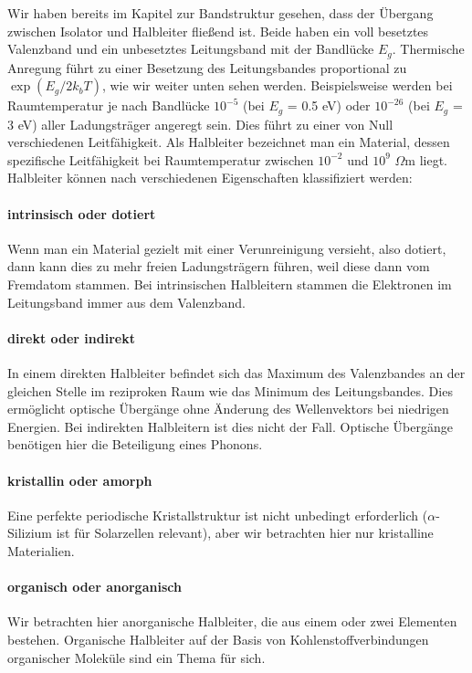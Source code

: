 Wir haben bereits im Kapitel zur Bandstruktur gesehen, dass der Übergang zwischen Isolator und Halbleiter fließend ist. Beide haben ein voll besetztes Valenzband und ein unbesetztes Leitungsband mit der Bandlücke $E_g$. Thermische Anregung führt zu einer Besetzung des Leitungsbandes proportional zu $\exp(E_g / 2 k_b T)$, wie wir weiter unten sehen werden. Beispielsweise werden bei Raumtemperatur je nach Bandlücke $10^{-5}$ (bei $E_g$ = 0.5 eV) oder $10^{-26}$ (bei $E_g$ = 3 eV) aller Ladungsträger angeregt sein. Dies führt zu einer von Null verschiedenen Leitfähigkeit. Als Halbleiter bezeichnet man ein Material, dessen spezifische Leitfähigkeit bei Raumtemperatur zwischen $10^{-2}$ und $10^9$ $\Omega$m liegt. Halbleiter können  nach verschiedenen Eigenschaften klassifiziert werden:


\paragraph*{intrinsisch oder dotiert} Wenn man ein Material gezielt mit einer Verunreinigung versieht, also dotiert, dann kann dies zu mehr freien Ladungsträgern führen, weil diese dann vom Fremdatom stammen. Bei intrinsischen Halbleitern stammen die Elektronen im Leitungsband immer aus dem Valenzband.

\paragraph*{direkt oder indirekt} In einem direkten Halbleiter befindet sich das Maximum des Valenzbandes an der gleichen Stelle im reziproken Raum wie das Minimum des Leitungsbandes. Dies ermöglicht optische  Übergänge ohne Änderung des Wellenvektors bei niedrigen Energien. Bei indirekten Halbleitern ist dies nicht der Fall. Optische Übergänge benötigen hier die Beteiligung eines Phonons.

\paragraph*{kristallin oder amorph} Eine perfekte periodische Kristallstruktur ist nicht unbedingt erforderlich ($\alpha$-Silizium ist für Solarzellen relevant), aber wir betrachten hier nur kristalline Materialien.

\paragraph*{organisch oder anorganisch} Wir betrachten hier anorganische Halbleiter, die aus einem oder zwei Elementen bestehen. Organische Halbleiter auf der Basis von Kohlenstoffverbindungen organischer Moleküle sind ein Thema für sich.


